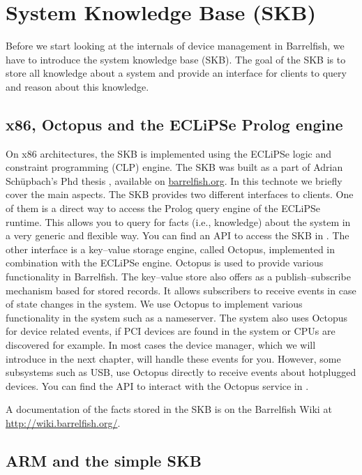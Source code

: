\documentclass[a4paper,11pt,twoside]{report}
\begin{document}
\chapter{System Knowledge Base (SKB)}

Before we start looking at the internals of device management in Barrelfish,
we have to introduce the system knowledge base (SKB). The goal of the SKB
is to store all knowledge about a system and provide an interface for
clients to query and reason about this knowledge.

\section{x86, Octopus and the ECLiPSe Prolog engine}

On x86 architectures, the SKB is implemented using the ECLiPSe logic and
constraint programming (CLP) engine. The SKB was built as a part of Adrian
Sch\"upbach's Phd thesis \cite{btn014-skb}, available on \url{barrelfish.org}.
In this technote we briefly cover the main aspects. The SKB provides two
different interfaces to clients. One of them is a direct way to access the
Prolog query engine of the ECLiPSe runtime. This allows you to query for facts
(i.e., knowledge) about the system in a very generic and flexible way. You can
find an API to access the SKB in . The other interface is a
key--value storage engine, called Octopus, implemented in combination with the
ECLiPSe engine. Octopus is used to provide various functionality in Barrelfish.
The key--value store also offers as a publish--subscribe mechanism based for
stored records. It allows subscribers to receive events in case of state
changes in the system. We use Octopus to implement various functionality in the
system such as a nameserver. The system also uses Octopus for device related
events, if PCI devices are found in the system or CPUs are discovered for
example. In most cases the device manager, which we will introduce in the next
chapter, will handle these events for you. However, some subsystems such as
USB, use Octopus directly to receive events about hotplugged devices. You can
find the API to interact with the Octopus service in
.

A documentation of the facts stored in the SKB is on the Barrelfish
Wiki at \url{http://wiki.barrelfish.org/}.


\section{ARM and the simple SKB}
\label{sec:simpleskb}
\end{document}
